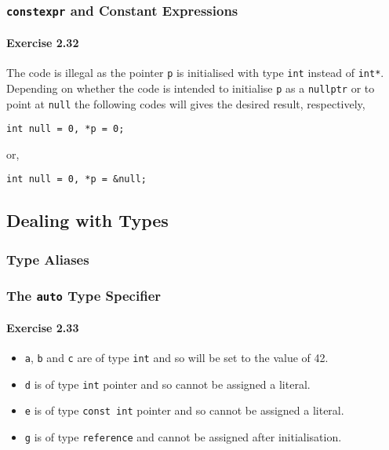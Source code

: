 \subsubsection{\texttt{constexpr} and Constant Expressions}

\paragraph{Exercise 2.32}
The code is illegal as the pointer \texttt{p} is initialised with type \texttt{int} instead of \texttt{int*}. Depending on whether the code is intended to initialise \texttt{p} as a \texttt{nullptr} or to point at \texttt{null} the following codes will gives the desired result, respectively,
\begin{center}
	\texttt{int null = 0, *p = 0;}
\end{center}
or,
\begin{center}
	\texttt{int null = 0, *p = \&null;}
\end{center}

\subsection{Dealing with Types}

\subsubsection{Type Aliases}

\subsubsection{The \texttt{auto} Type Specifier}

\paragraph{Exercise 2.33}
\begin{itemize}
	\item 
		\texttt{a}, \texttt{b} and \texttt{c} are of type \texttt{int} and so will be set to the value of 42.
	\item 
		\texttt{d} is of type \texttt{int} pointer and so cannot be assigned a literal.
	\item 
		\texttt{e} is of type \texttt{const int} pointer and so cannot be assigned a literal.
	\item 
		\texttt{g} is of type \texttt{reference} and cannot be assigned after initialisation.
\end{itemize}

